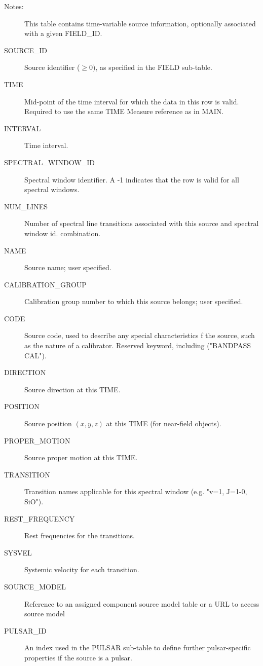 \documentclass{article}
\begin{document}
\begin{description}

\item[Notes:] This table contains time-variable source information,
optionally associated with a given FIELD\_ID.

\item[SOURCE\_ID] Source identifier ($\geq 0)$, as specified in the
FIELD sub-table.

\item[TIME] Mid-point of the time interval for which the data in this
row is valid. Required to use the same TIME Measure reference as in
MAIN.

\item[INTERVAL] Time interval.

\item[SPECTRAL\_WINDOW\_ID] Spectral window identifier. A -1 indicates
that the row is valid for all spectral windows.

\item[NUM\_LINES] Number of spectral line transitions associated with
this source and spectral window id. combination.

\item[NAME] Source name; user specified.

\item[CALIBRATION\_GROUP] Calibration group number to which this source
belongs; user specified.

\item[CODE] Source code, used to describe any special characteristics
f the source, such as the nature of a calibrator. Reserved keyword,
including ("BANDPASS CAL").

\item[DIRECTION] Source direction at this TIME.

\item[POSITION] Source position $(x,y,z)$ at this TIME (for near-field
objects).

\item[PROPER\_MOTION] Source proper motion at this TIME.

\item[TRANSITION] Transition names applicable for this spectral window
(e.g. "v=1, J=1-0, SiO").

\item[REST\_FREQUENCY] Rest frequencies for the transitions.

\item[SYSVEL] Systemic velocity for each transition.

\item[SOURCE\_MODEL] Reference to an assigned component source model
table or a URL to access source model

\item[PULSAR\_ID] An index used in the PULSAR sub-table to define
further pulsar-specific properties if the source is a pulsar.

\end{description}
\end{document}
